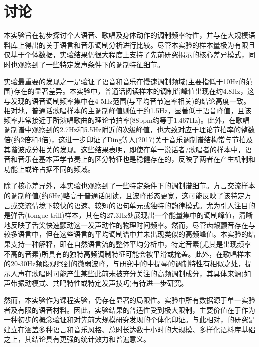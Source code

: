 \documentclass[jou,12pt,floatsintext]{apa7} %
\begin{document}
\section{讨论}

本实验旨在初步探讨个人语音、歌唱及身体动作的调制频率特性，并与\textcite{ding2017temporal}在大规模语料库上得出的关于语言和音乐调制分析进行比较。尽管本实验的样本量极为有限且仅基于个体数据，实验结果仍很大程度上支持了先前研究揭示的核心差异模式，同时也观察到了一些特定发声条件下的调制特征细节。

实验最重要的发现之一是验证了语音和音乐在慢速调制频域(主要指低于10Hz的范围)存在的显著差异。本实验中，普通话阅读样本的调制谱峰值出现在约4.8Hz，这与\textcite{ding2017temporal}发现的语音调制频率集中在4-5Hz范围(与平均音节速率相关)的结论高度一致。相对地，普通话歌唱样本的主调制峰值则位于约1.5Hz，显著低于语音峰值，且该频率非常接近于所演唱歌曲的理论节拍率(88bpm约等于1.467Hz)。此外，在歌唱调制谱中观察到的2.7Hz和5.5Hz附近的次级峰值，也大致对应于理论节拍率的整数倍(约2倍和4倍)，这进一步印证了Ding等人(2017)关于音乐调制谱结构常与节拍及其谐波成分相关的发现。这些结果表明，即使在单一说话者/歌唱者的样本中，语音和音乐在基本声学节奏上的区分特征也是稳健存在的，反映了两者在产生机制和功能上或许占据不同的频域。

除了核心差异外，本实验也观察到了一些特定条件下的调制谱细节。方言交流样本的调制峰值(约6Hz)略高于普通话阅读，且波峰形态更宽，这可能反映了该特定方言或交流情境下较快的语速、较短的语句单元或独特的韵律模式。尤为引人注目的是弹舌(tongue trill)样本，其在约27.3Hz处展现出一个能量集中的调制峰值，清晰地反映了舌尖快速颤动这一发声动作的物理时间频率。然而，尽管齿龈颤音存在与较多语言中，但在这些语言的平均调制谱中并未出现类似的高频峰值。本实验的结果支持一种解释，即在自然语言流的整体平均分析中，特定音素(尤其是出现频率不高的音素)所具有的独特高频调制特征可能会被平滑或掩盖。此外，在歌唱样本的20-30Hz频段观察到的微弱波峰，与\textcite{ding2017temporal}研究中的中提琴的调制特性有相似之处，提示人声在歌唱时可能产生某些此前未被充分关注的高频调制成分，其具体来源(如声带振动模式、共鸣特性或特定发声技巧)有待进一步研究。

然而，本实验作为课程实验，仍存在显著的局限性。实验中所有数据源于单一实验者及有限的语音材料。因此，实验结果的普适性受到极大限制，主要价值在于作为一种初步的概念验证和对先前大规模研究发现的个体化印证。与此相对，\textcite{ding2017temporal}的研究是建立在涵盖多种语言和音乐风格、总时长达数十小时的大规模、多样化语料库基础之上，其结论具有更强的统计效力和普遍意义。

\printbibliography[title={\heiti 参\ 考\ 文\ 献}]
\end{document}

